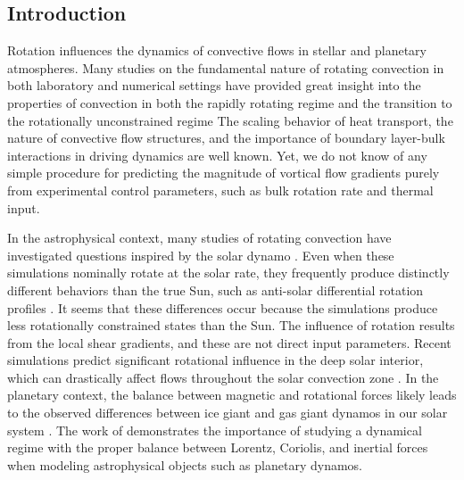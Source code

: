 \subsection{Introduction}
\label{sec_ro_p19_:intro}
Rotation influences the dynamics of convective flows in
stellar and planetary atmospheres.
Many studies on the fundamental nature of
rotating convection in both laboratory and numerical settings
have provided great insight into the properties of convection 
in both the rapidly rotating regime 
and the transition to the rotationally unconstrained regime 
\citep{king&all2009, zhong&all2009, schmitz&tilgner2009, king&all2012, julien&all2012, king&all2013, ecke&niemela2014, stellmach&all2014, cheng&all2015, gastine&all2016}
The scaling behavior of heat transport, the nature of convective flow
structures, and the importance of boundary layer-bulk interactions in driving dynamics are well known.
Yet, we do not know of any simple procedure for predicting the magnitude of vortical flow gradients 
purely from experimental control parameters, such as bulk rotation rate and thermal input.

In the astrophysical context,
many studies of rotating convection have investigated questions inspired by the solar dynamo
\citep{glatzmaier&gilman1982, busse2002, brown&all2008,
brown&all2010, brown&all2011, augustson&all2012, guerrero&all2013, kapyla&all2014}.
Even when these simulations nominally rotate at the solar rate,
they frequently produce distinctly different behaviors than the true Sun,
such as anti-solar differential rotation profiles  \citep{gastine&all2014, brun&all2017}.
It seems that these differences occur because the simulations produce less rotationally 
constrained states than the Sun. 
The influence of rotation results from the local 
shear gradients, and these are not direct input parameters.
Recent simulations predict significant rotational influence in the deep solar interior, 
which can drastically affect flows throughout the solar convection zone 
\citep{featherstone&hindman2016a, greer&all2016}. 
In the planetary context, the balance between magnetic
and rotational forces likely leads to the observed differences between ice
giant and gas giant dynamos in our solar system \citep{soderlund&all2015}.
The work of \cite{aurnou&king2017} demonstrates the importance of studying a dynamical regime
with the proper balance between Lorentz, Coriolis, and inertial forces when modeling
astrophysical objects such as planetary dynamos.

